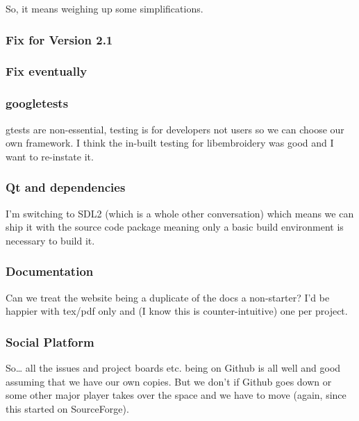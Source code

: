 \documentclass[a4paper, 11pt]{report}
\begin{document}
So, it means weighing up some simplifications.

\hypertarget{fix-for-version-2.1-1}{%
\subsubsection{Fix for Version 2.1}\label{fix-for-version-2.1-1}}

\hypertarget{fix-eventually-1}{%
\subsubsection{Fix eventually}\label{fix-eventually-1}}

\hypertarget{googletests-1}{%
\subsubsection{googletests}\label{googletests-1}}

gtests are non-essential, testing is for developers not users so we can
choose our own framework. I think the in-built testing for libembroidery
was good and I want to re-instate it.

\hypertarget{qt-and-dependencies-1}{%
\subsubsection{Qt and dependencies}\label{qt-and-dependencies-1}}

I'm switching to SDL2 (which is a whole other conversation) which means
we can ship it with the source code package meaning only a basic build
environment is necessary to build it.

\hypertarget{documentation-1}{%
\subsubsection{Documentation}\label{documentation-1}}

Can we treat the website being a duplicate of the docs a non-starter?
I'd be happier with tex/pdf only and (I know this is counter-intuitive)
one per project.

\hypertarget{social-platform-1}{%
\subsubsection{Social Platform}\label{social-platform-1}}

So\ldots{} all the issues and project boards etc. being on Github is all
well and good assuming that we have our own copies. But we don't if
Github goes down or some other major player takes over the space and we
have to move (again, since this started on SourceForge).
\end{document}
